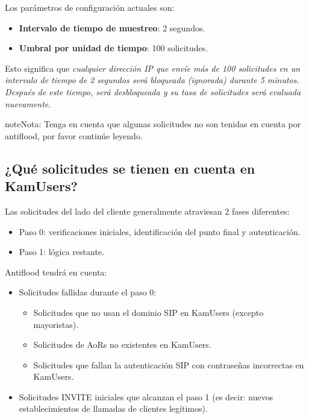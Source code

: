 \documentclass[letterpaper,10pt,spanish]{sphinxmanual}
\begin{document}
Los parámetros de configuración actuales son:
\begin{itemize}
\item {} 
\textbf{Intervalo de tiempo de muestreo}: 2 segundos.

\item {} 
\textbf{Umbral por unidad de tiempo}: 100 solicitudes.

\end{itemize}

Esto significa que \emph{cualquier dirección IP que envíe más de 100 solicitudes en un intervalo de tiempo de 2 segundos será bloqueada (ignorada) durante 5 minutos. Después de este tiempo, será desbloqueada y su tasa de solicitudes será evaluada nuevamente}.

\begin{notice}{note}{Nota:}
Tenga en cuenta que algunas solicitudes no son tenidas en cuenta por antiflood, por favor continúe leyendo.
\end{notice}


\subsection{¿Qué solicitudes se tienen en cuenta en KamUsers?}
\label{security_and_maintenance/security/antiflooding:which-requests-are-taken-into-account-in-kamusers}
Las solicitudes del lado del cliente generalmente atraviesan 2 fases diferentes:
\begin{itemize}
\item {} 
Paso 0: verificaciones iniciales, identificación del punto final y autenticación.

\item {} 
Paso 1: lógica restante.

\end{itemize}

Antiflood tendrá en cuenta:
\begin{itemize}
\item {} 
Solicitudes fallidas durante el paso 0:
\begin{itemize}
\item {} 
Solicitudes que no usan el dominio SIP en KamUsers (excepto mayoristas).

\item {} 
Solicitudes de AoRs no existentes en KamUsers.

\item {} 
Solicitudes que fallan la autenticación SIP con contraseñas incorrectas en KamUsers.

\end{itemize}

\item {} 
Solicitudes INVITE iniciales que alcanzan el paso 1 (es decir: nuevos establecimientos de llamadas de clientes legítimos).

\end{itemize}
\end{document}

